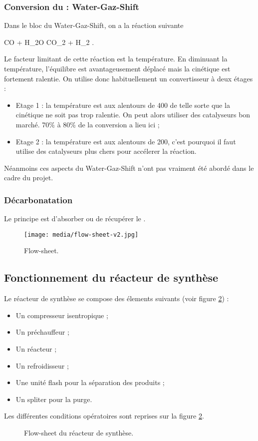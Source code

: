\subsubsection{Conversion du  : Water-Gaz-Shift}
Dans le bloc du Water-Gaz-Shift, on a la réaction
suivante
\begin{chemmath}
	CO + H_2O \Leftrightarrow CO_2 + H_2 . 
\end{chemmath}
Le facteur limitant de cette réaction est la température.
En diminuant la température, l'équilibre est avantageusement
déplacé mais la cinétique est fortement ralentie. On
utilise donc habituellement un convertisseur à deux étages :
\begin{itemize}
	\item	Etage 1 : la température est aux alentours de
	\unit{400}{\degreecelsius} de telle sorte que la cinétique
	ne soit pas trop ralentie. On peut alors utiliser
	des catalyseurs bon marché. 70\% à 80\% de la conversion a lieu
	ici ;
	\item Etage 2 : la température est aux alentours de
	\unit{200}{\degreecelsius}, c'est pourquoi il faut utilise
	des catalyseurs plus chers pour accélerer la réaction.
\end{itemize}

Néanmoins ces aspects du Water-Gaz-Shift n'ont pas
vraiment été abordé dans le cadre du projet.

\subsubsection{Décarbonatation}
Le principe est d'absorber ou de récupérer le .

\begin{figure}[ht!]
	\centering
	\texttt{[image: media/flow-sheet-v2.jpg]}
	\caption{Flow-sheet.}
	\label{fig:flow-sheet}
\end{figure}

\subsection{Fonctionnement du réacteur de synthèse}
Le réacteur de synthèse se compose des élements suivants 
(voir figure \ref{fig:flow-sheet-aspen}) :
\begin{itemize}
	\item Un compresseur isentropique ;
	\item Un préchauffeur ;
	\item Un réacteur ;
	\item Un refroidisseur ;
	\item Une unité flash pour la séparation des produits ;
	\item Un spliter pour la purge.
\end{itemize}
Les différentes conditions opératoires sont reprises
sur la figure \ref{fig:flow-sheet-aspen}.
\begin{figure}[ht!]
	\centering
	\caption{Flow-sheet du réacteur de synthèse.}
	\label{fig:flow-sheet-aspen}
\end{figure}

